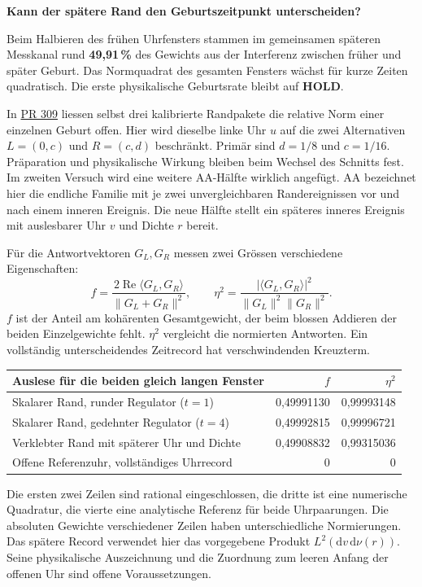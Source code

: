 \documentclass[12pt,a4paper]{article}
\newcommand{\sect}[1]{\par\vspace{4pt}{\large\bfseries\color{teal}#1}\par}
\newcommand{\titleline}[1]{{\LARGE\bfseries #1}\par\vspace{5pt}}
\newcommand{\callout}[1]{\par\noindent\colorbox{soft}{\parbox{\dimexpr\linewidth-2\fboxsep\relax}{\vspace{3pt}#1\vspace{3pt}}}\par}
\newcommand{\repo}{https://github.com/thomasmgfeller/x6-spectral-astrolabium/blob/f461985f67aa0c1aef972d529a9b09575fe8df77/research/rax_cqg/dust_collapse}
\newcommand{\dd}{\mathrm{d}}
\begin{document}
\titleline{Kann der spätere Rand den Geburtszeitpunkt unterscheiden?}
\callout{Beim Halbieren des frühen Uhrfensters stammen im gemeinsamen späteren Messkanal rund \textbf{49,91\,\%} des Gewichts aus der Interferenz zwischen früher und später Geburt. Das Normquadrat des gesamten Fensters wächst für kurze Zeiten quadratisch. Die erste physikalische Geburtsrate bleibt auf \textbf{HOLD}.}

\sect{Versuch}
In \href{\repo/zero_one_pairing_v0_1/README.md}{PR 309} liessen selbst drei kalibrierte Randpakete die relative Norm einer einzelnen Geburt offen. Hier wird dieselbe linke Uhr $u$ auf die zwei Alternativen $L=(0,c)$ und $R=(c,d)$ beschränkt. Primär sind $d=1/8$ und $c=1/16$. Präparation und physikalische Wirkung bleiben beim Wechsel des Schnitts fest. Im zweiten Versuch wird eine weitere AA-Hälfte wirklich angefügt. AA bezeichnet hier die endliche Familie mit je zwei unvergleichbaren Randereignissen vor und nach einem inneren Ereignis. Die neue Hälfte stellt ein späteres inneres Ereignis mit auslesbarer Uhr $v$ und Dichte $r$ bereit.

Für die Antwortvektoren $G_L,G_R$ messen zwei Grössen verschiedene Eigenschaften:
\[
 f=\frac{2\operatorname{Re}\langle G_L,G_R\rangle}{\|G_L+G_R\|^2},
 \qquad \eta^2=\frac{|\langle G_L,G_R\rangle|^2}{\|G_L\|^2\|G_R\|^2}.
\]
$f$ ist der Anteil am kohärenten Gesamtgewicht, der beim blossen Addieren der beiden Einzelgewichte fehlt. $\eta^2$ vergleicht die normierten Antworten. Ein vollständig unterscheidendes Zeitrecord hat verschwindenden Kreuzterm.
\begin{center}\begin{tabularx}{\linewidth}{@{}Xrr@{}}\toprule
Auslese für die beiden gleich langen Fenster & $f$ & $\eta^2$\\\midrule
Skalarer Rand, runder Regulator ($t=1$) & 0,49991130 & 0,99993148\\
Skalarer Rand, gedehnter Regulator ($t=4$) & 0,49992815 & 0,99996721\\
Verklebter Rand mit späterer Uhr und Dichte & 0,49908832 & 0,99315036\\
Offene Referenzuhr, vollständiges Uhrrecord & 0 & 0\\\bottomrule
\end{tabularx}\end{center}
Die ersten zwei Zeilen sind rational eingeschlossen, die dritte ist eine numerische Quadratur, die vierte eine analytische Referenz für beide Uhrpaarungen. Die absoluten Gewichte verschiedener Zeilen haben unterschiedliche Normierungen. Das spätere Record verwendet hier das vorgegebene Produkt $L^2(\dd v\,\dd\nu(r))$. Seine physikalische Auszeichnung und die Zuordnung zum leeren Anfang der offenen Uhr sind offene Voraussetzungen.
\end{document}
